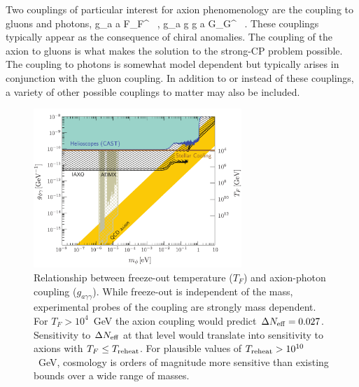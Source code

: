 
Two couplings of particular interest for axion phenomenology are the coupling to gluons and photons, 
\beq
{} g_{a \gamma \gamma} a \tilde F_{\mu \nu}F^{\mu\nu} \ , \qquad \qquad {} g_{a g g} a \tilde G_{\mu \nu}G^{\mu\nu}  \ .
\eeq
These couplings typically appear as the consequence of chiral anomalies.  The coupling of the axion to gluons is what makes the solution to the strong-CP problem possible.  The coupling to photons is somewhat model dependent but typically arises in conjunction with the gluon coupling.  In addition to or instead of these couplings, a variety of other possible couplings to matter may also be included.

\begin{figure}[h!]
\centering \includegraphics[width=0.70\textwidth]{Neutrinos/AxionPhotonWithFuture.pdf}
\caption{Relationship between freeze-out temperature ($T_F$) and axion-photon coupling ($g_{a\gamma\gamma}$).  While freeze-out is independent of the mass, experimental probes of the coupling are strongly mass dependent.  For $T_F > 10^4$~GeV the axion coupling would predict $\Delta N_{\rm eff} = 0.027$.  Sensitivity to $\Delta N_{\rm eff}$ at that level would translate into sensitivity to axions with $T_F \leq T_{\rm reheat}$.  For plausible values of $T_{\rm reheat} > 10^{10}$~GeV, cosmology is orders of magnitude more sensitive than existing bounds over a wide range of masses.}
\label{fig:axionphoton}
\end{figure}

